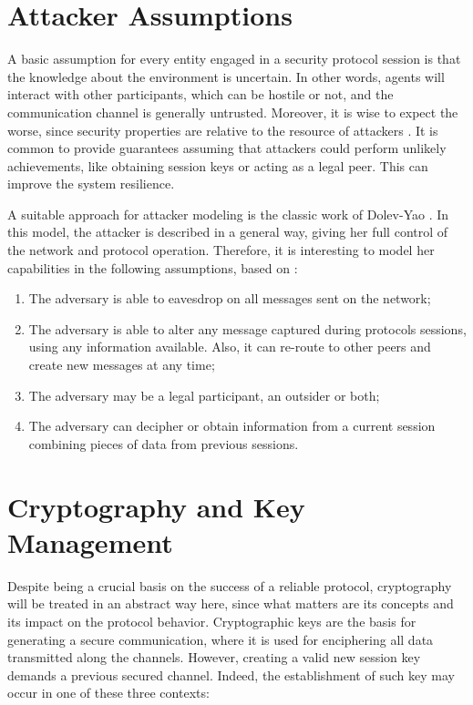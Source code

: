 \section{Attacker Assumptions}
A basic assumption for every entity engaged in a security protocol session is that the knowledge about the environment is uncertain. In other words, agents will interact with other participants, which can be hostile or not, and the communication channel is generally untrusted. Moreover, it is wise to expect the worse, since security properties are relative to the resource of attackers \cite{boyd-mathuria}. It is common to provide guarantees assuming that attackers could perform unlikely achievements, like obtaining session keys or acting as a legal peer. This can improve the system resilience.

A suitable approach for attacker modeling is the classic work of Dolev-Yao \cite{dolev-yao}. In this model, the attacker is described in a general way, giving her full control of the network and protocol operation. Therefore, it is interesting to model her capabilities in the following assumptions, based on \cite{boyd-mathuria}:

\begin{enumerate}
  \item The adversary is able to eavesdrop on all messages sent on the network;
  \item The adversary is able to alter any message captured during protocols sessions, using any information available. Also, it can re-route to other peers and create new messages at any time;
  \item The adversary may be a legal participant, an outsider or both;
  \item The adversary can decipher or obtain information from a current session combining pieces of data from previous sessions.
\end{enumerate}




















\section{Cryptography and Key Management}
Despite being a crucial basis on the success of a reliable protocol, cryptography will be treated in an abstract way here, since what matters are its concepts and its impact on the protocol behavior. Cryptographic keys are the basis for generating a secure communication, where it is used for enciphering all data transmitted along the channels. However, creating a valid new session key demands a previous secured channel. Indeed, the establishment of such key may occur in one of these three contexts:

